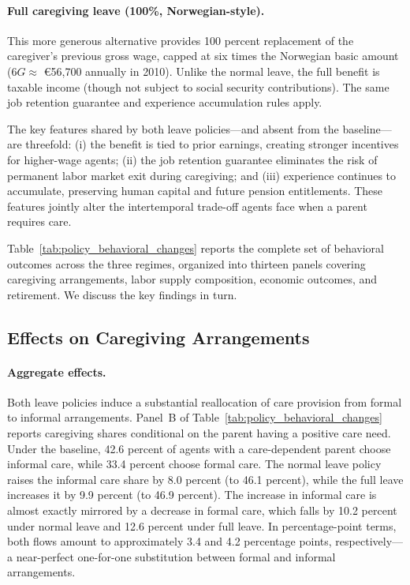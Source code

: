 \paragraph{Full caregiving leave (100\%, Norwegian-style).} This more generous alternative provides 100 percent replacement of the caregiver's previous gross wage, capped at six times the Norwegian basic amount ($6G \approx$ \euro{56,700} annually in 2010). Unlike the normal leave, the full benefit is taxable income (though not subject to social security contributions). The same job retention guarantee and experience accumulation rules apply.

The key features shared by both leave policies---and absent from the baseline---are threefold: (i) the benefit is tied to prior earnings, creating stronger incentives for higher-wage agents; (ii) the job retention guarantee eliminates the risk of permanent labor market exit during caregiving; and (iii) experience continues to accumulate, preserving human capital and future pension entitlements. These features jointly alter the intertemporal trade-off agents face when a parent requires care.

Table~\ref{tab:policy_behavioral_changes} reports the complete set of behavioral outcomes across the three regimes, organized into thirteen panels covering caregiving arrangements, labor supply composition, economic outcomes, and retirement. We discuss the key findings in turn.


\subsection{Effects on Caregiving Arrangements}\label{subsec:cg_arrangements}

\paragraph{Aggregate effects.} Both leave policies induce a substantial reallocation of care provision from formal to informal arrangements. Panel~B of Table~\ref{tab:policy_behavioral_changes} reports caregiving shares conditional on the parent having a positive care need. Under the baseline, 42.6 percent of agents with a care-dependent parent choose informal care, while 33.4 percent choose formal care. The normal leave policy raises the informal care share by 8.0 percent (to 46.1 percent), while the full leave increases it by 9.9 percent (to 46.9 percent). The increase in informal care is almost exactly mirrored by a decrease in formal care, which falls by 10.2 percent under normal leave and 12.6 percent under full leave. In percentage-point terms, both flows amount to approximately 3.4 and 4.2 percentage points, respectively---a near-perfect one-for-one substitution between formal and informal arrangements.

